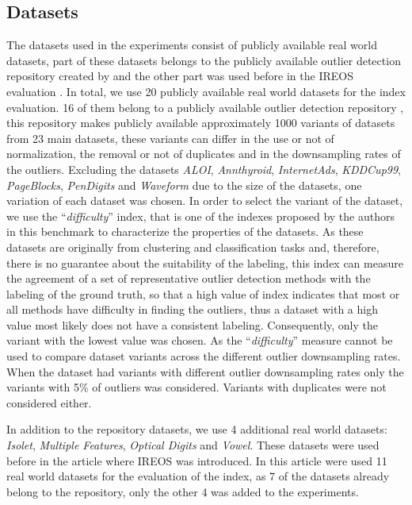 
\subsection{Datasets}
The datasets used in the experiments consist of publicly available real world datasets, part of these datasets belongs to the publicly available outlier detection repository created by \cite{campos2016} and the other part was used before in the IREOS evaluation \cite{marques2015}. In total, we use 20 publicly available real world datasets for the index evaluation. 16 of them belong to a publicly available outlier detection repository \cite{campos2016}, this repository makes publicly available approximately 1000 variants of datasets from 23 main datasets, these variants can differ in the use or not of normalization, the removal or not of duplicates and in the downsampling rates of the outliers. Excluding the datasets \textit{ALOI}, \textit{Annthyroid}, \textit{InternetAds}, \textit{KDDCup99}, \textit{PageBlocks}, \textit{PenDigits} and \textit{Waveform} due to the size of the datasets, one variation of each dataset was chosen. In order to select the variant of the dataset, we use the ``\textit{difficulty}'' index, that is one of the indexes proposed by the authors in this benchmark to characterize the properties of the datasets. As these datasets are originally from clustering and classification tasks and, therefore, there is no guarantee about the suitability of the labeling, this index can measure the agreement of a set of representative outlier detection methods with the labeling of the ground truth, so that a high value of index indicates that most or all methods have difficulty in finding the outliers, thus a dataset with a high value most likely does not have a consistent labeling. Consequently, only the variant with the lowest value was chosen. As the ``\textit{difficulty}'' measure cannot be used to compare dataset variants across the different outlier downsampling rates. When the dataset had variants with different outlier downsampling rates only the variants with 5\% of outliers was considered. Variants with duplicates were not considered either.

In addition to the repository datasets, we use 4 additional real world datasets: \textit{Isolet}, \textit{Multiple Features}, \textit{Optical Digits} and \textit{Vowel}. These datasets were used before in the article where IREOS was introduced. In this article were used 11 real world datasets for the evaluation of the index, as 7 of the datasets already belong to the repository, only the other 4 was added to the experiments. 

